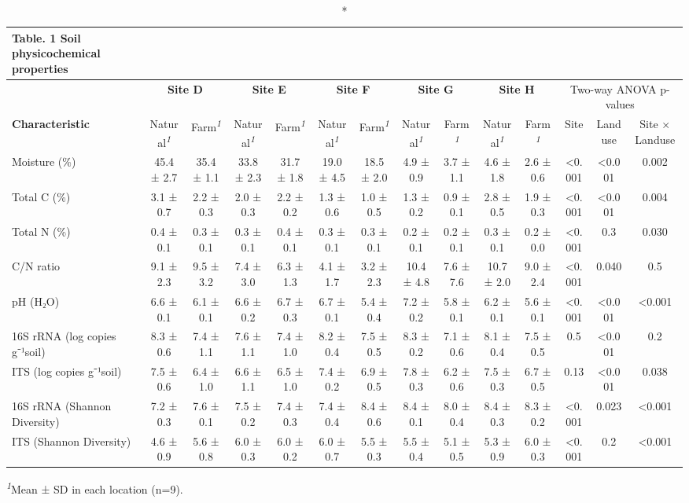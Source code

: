 \newlength\holdLTleft\newlength\holdLTright\setlength\holdLTleft{\LTleft}\relax\setlength\holdLTright{\LTright}\relax\setlength{}
\setlength{}\setlength{\LTpost}{0mm}
\begin{longtable}{@{\extracolsep{\fill}}lccccccccccccc}
\caption*{
{\large Table. 1 Soil physicochemical properties}
} \\ 
\toprule
 & \multicolumn{2}{c}{\textbf{Site D}} & \multicolumn{2}{c}{\textbf{Site E}} & \multicolumn{2}{c}{\textbf{Site F}} & \multicolumn{2}{c}{\textbf{Site G}} & \multicolumn{2}{c}{\textbf{Site H}} & \multicolumn{3}{c}{Two-way ANOVA p-values} \\ 
\cmidrule(lr){2-3} \cmidrule(lr){4-5} \cmidrule(lr){6-7} \cmidrule(lr){8-9} \cmidrule(lr){10-11} \cmidrule(lr){12-14}
\textbf{Characteristic} & Natural\textsuperscript{\textit{1}} & Farm\textsuperscript{\textit{1}} & Natural\textsuperscript{\textit{1}} & Farm\textsuperscript{\textit{1}} & Natural\textsuperscript{\textit{1}} & Farm\textsuperscript{\textit{1}} & Natural\textsuperscript{\textit{1}} & Farm\textsuperscript{\textit{1}} & Natural\textsuperscript{\textit{1}} & Farm\textsuperscript{\textit{1}} & Site & Landuse & Site × Landuse \\ 
\midrule\addlinespace[2.5pt]
Moisture (\%) & 45.4 ± 2.7 & 35.4 ± 1.1 & 33.8 ± 2.3 & 31.7 ± 1.8 & 19.0 ± 4.5 & 18.5 ± 2.0 & 4.9 ± 0.9 & 3.7 ± 1.1 & 4.6 ± 1.8 & 2.6 ± 0.6 & <0.001 & <0.001 & 0.002 \\ 
Total C (\%) & 3.1 ± 0.7 & 2.2 ± 0.3 & 2.0 ± 0.3 & 2.2 ± 0.2 & 1.3 ± 0.6 & 1.0 ± 0.5 & 1.3 ± 0.2 & 0.9 ± 0.1 & 2.8 ± 0.5 & 1.9 ± 0.3 & <0.001 & <0.001 & 0.004 \\ 
Total N (\%) & 0.4 ± 0.1 & 0.3 ± 0.1 & 0.3 ± 0.1 & 0.4 ± 0.1 & 0.3 ± 0.1 & 0.3 ± 0.1 & 0.2 ± 0.1 & 0.2 ± 0.1 & 0.3 ± 0.1 & 0.2 ± 0.0 & <0.001 & 0.3 & 0.030 \\ 
C/N ratio & 9.1 ± 2.3 & 9.5 ± 3.2 & 7.4 ± 3.0 & 6.3 ± 1.3 & 4.1 ± 1.7 & 3.2 ± 2.3 & 10.4 ± 4.8 & 7.6 ± 7.6 & 10.7 ± 2.0 & 9.0 ± 2.4 & <0.001 & 0.040 & 0.5 \\ 
pH (H₂O) & 6.6 ± 0.1 & 6.1 ± 0.1 & 6.6 ± 0.2 & 6.7 ± 0.3 & 6.7 ± 0.1 & 5.4 ± 0.4 & 7.2 ± 0.2 & 5.8 ± 0.1 & 6.2 ± 0.1 & 5.6 ± 0.1 & <0.001 & <0.001 & <0.001 \\ 
16S rRNA (log copies g⁻¹soil) & 8.3 ± 0.6 & 7.4 ± 1.1 & 7.6 ± 1.1 & 7.4 ± 1.0 & 8.2 ± 0.4 & 7.5 ± 0.5 & 8.3 ± 0.2 & 7.1 ± 0.6 & 8.1 ± 0.4 & 7.5 ± 0.5 & 0.5 & <0.001 & 0.2 \\ 
ITS (log copies g⁻¹soil) & 7.5 ± 0.6 & 6.4 ± 1.0 & 6.6 ± 1.1 & 6.5 ± 1.0 & 7.4 ± 0.2 & 6.9 ± 0.5 & 7.8 ± 0.3 & 6.2 ± 0.6 & 7.5 ± 0.3 & 6.7 ± 0.5 & 0.13 & <0.001 & 0.038 \\ 
16S rRNA (Shannon Diversity) & 7.2 ± 0.3 & 7.6 ± 0.1 & 7.5 ± 0.2 & 7.4 ± 0.3 & 7.4 ± 0.4 & 8.4 ± 0.6 & 8.4 ± 0.1 & 8.0 ± 0.4 & 8.4 ± 0.3 & 8.3 ± 0.2 & <0.001 & 0.023 & <0.001 \\ 
ITS (Shannon Diversity) & 4.6 ± 0.9 & 5.6 ± 0.8 & 6.0 ± 0.3 & 6.0 ± 0.2 & 6.0 ± 0.7 & 5.5 ± 0.3 & 5.5 ± 0.4 & 5.1 ± 0.5 & 5.3 ± 0.9 & 6.0 ± 0.3 & <0.001 & 0.2 & <0.001 \\ 
\bottomrule
\end{longtable}
\begin{minipage}{\linewidth}
\textsuperscript{\textit{1}}Mean ± SD in each location (n=9).\\
\end{minipage}
\setlength\LTleft{\holdLTleft}
\setlength\LTright{\holdLTright}
